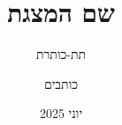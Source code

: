 \documentclass{beamer}
\title[שם המצגת]{שם המצגת}
\subtitle{תת-כותרת}
\author[כותבים]{כותבים}
\date[יוני 2025]{יוני 2025}
\begin{document}
\frame{\titlepage}

\end{document}
